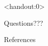 \begin{frame}<handout:0>
\begin{center}
\Huge Questions???
\end{center}
\end{frame}
\begin{frame}%
\begin{center}
\normalsize References
\end{center}
\scriptsize


\end{frame}
